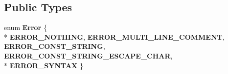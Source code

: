 \subsection*{Public Types}
\begin{DoxyCompactItemize}
\item 
enum {\bfseries Error} \{ \\*
{\bfseries E\+R\+R\+O\+R\+\_\+\+N\+O\+T\+H\+I\+NG}, 
{\bfseries E\+R\+R\+O\+R\+\_\+\+M\+U\+L\+T\+I\+\_\+\+L\+I\+N\+E\+\_\+\+C\+O\+M\+M\+E\+NT}, 
{\bfseries E\+R\+R\+O\+R\+\_\+\+C\+O\+N\+S\+T\+\_\+\+S\+T\+R\+I\+NG}, 
{\bfseries E\+R\+R\+O\+R\+\_\+\+C\+O\+N\+S\+T\+\_\+\+S\+T\+R\+I\+N\+G\+\_\+\+E\+S\+C\+A\+P\+E\+\_\+\+C\+H\+AR}, 
\\*
{\bfseries E\+R\+R\+O\+R\+\_\+\+S\+Y\+N\+T\+AX}
 \}\hypertarget{class_object_script_1_1_o_s_1_1_core_1_1_tokenizer_add691270605cee68b500e049dfa2c2f3}{}\label{class_object_script_1_1_o_s_1_1_core_1_1_tokenizer_add691270605cee68b500e049dfa2c2f3}


\end{DoxyCompactItemize}
